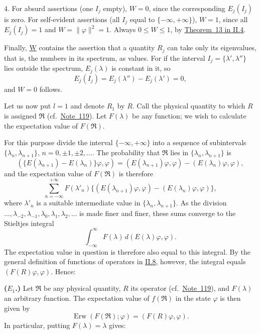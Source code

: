 \documentclass[fontsize=13pt,twoside,openany,headings=normal,parskip=false,bookmarkpackage=false,DIV=calc]{scrbook}
\begin{document}
\hypertarget{origpage-105}{}%
4. For absurd assertions (one $I_j$ empty), $W=0$, since the corresponding $E_j(I_j)$ is zero. For self-evident assertions (all $I_j$ equal to $\{-\infty,+\infty\}$), $W=1$, since all $E_j(I_j)=1$ and $W=\|\varphi\|^2=1$. Always $0\le W\le1$, by \hyperref[thm:II.13]{Theorem~13 in II.4}.

Finally, \hyperref[post:III.1.W]{W} contains the assertion that a quantity $R_j$ can take only its eigenvalues, that is, the numbers in its spectrum, as values. For if the interval $I_j=\{\lambda',\lambda''\}$ lies outside the spectrum, $E_j(\lambda)$ is constant in it, so
\[
E_j(I_j)=E_j(\lambda'')-E_j(\lambda')=0,
\]
and $W=0$ follows.

Let us now put $l=1$ and denote $R_1$ by $R$. Call the physical quantity to which $R$ is assigned $\mathfrak R$ (cf.\ \hyperlink{note-119}{Note~119}). Let $F(\lambda)$ be any function; we wish to calculate the expectation value of $F(\mathfrak R)$.

For this purpose divide the interval $\{-\infty,+\infty\}$ into a sequence of subintervals $\{\lambda_n,\lambda_{n+1}\}$, $n=0,\pm1,\pm2,\ldots$. The probability that $\mathfrak R$ lies in $\{\lambda_n,\lambda_{n+1}\}$ is
\[
(\{E(\lambda_{n+1})-E(\lambda_n)\}\varphi,\varphi)
=(E(\lambda_{n+1})\varphi,\varphi)-(E(\lambda_n)\varphi,\varphi),
\]
and the expectation value of $F(\mathfrak R)$ is therefore
\[
\sum_{n=-\infty}^{+\infty}F(\lambda'_n)
\{(E(\lambda_{n+1})\varphi,\varphi)-(E(\lambda_n)\varphi,\varphi)\},
\]
where $\lambda'_n$ is a suitable intermediate value in $\{\lambda_n,\lambda_{n+1}\}$. As the division $\ldots,\lambda_{-2},\lambda_{-1},\lambda_0,\lambda_1,\lambda_2,\ldots$ is made finer and finer, these sums converge to the Stieltjes integral
\[
\int_{-\infty}^{\infty}F(\lambda)\,d(E(\lambda)\varphi,\varphi).
\]
The expectation value in question is therefore also equal to this integral. By the general definition of functions of operators in \hyperref[sec:II.8]{II.8}, however, the integral equals $(F(R)\varphi,\varphi)$. Hence:

\leavevmode{}\label{post:III.1.E1}\textbf{($E_1$.)} Let $\mathfrak R$ be any physical quantity, $R$ its operator (cf.\ \hyperlink{note-119}{Note~119}), and $F(\lambda)$ an arbitrary function. The expectation value of $f(\mathfrak R)$ in the state $\varphi$ is then given by
\[
\operatorname{Erw}(F(\mathfrak R);\varphi)=(F(R)\varphi,\varphi).
\]
In particular, putting $F(\lambda)=\lambda$ gives:
\end{document}
